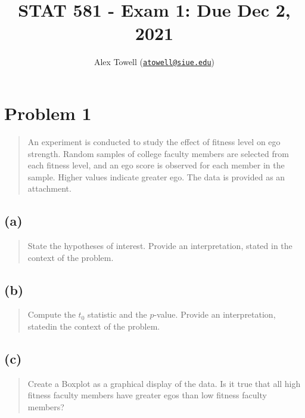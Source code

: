 \documentclass[
]{article}
\title{STAT 581 - Exam 1: Due Dec 2, 2021}
\author{Alex Towell
(\href{mailto:atowell@siue.edu}{\nolinkurl{atowell@siue.edu}})}
\date{}
\begin{document}
\maketitle

\hypertarget{problem-1}{%
\section{Problem 1}\label{problem-1}}

\begin{quote}
An experiment is conducted to study the effect of fitness level on ego
strength. Random samples of college faculty members are selected from
each fitness level, and an ego score is observed for each member in the
sample. Higher values indicate greater ego. The data is provided as an
attachment.
\end{quote}

\vspace{50pt}

\hypertarget{a}{%
\subsection{(a)}\label{a}}

\begin{quote}
State the hypotheses of interest. Provide an interpretation, stated in
the context of the problem.
\end{quote}

\vspace{50pt}

\hypertarget{b}{%
\subsection{(b)}\label{b}}

\begin{quote}
Compute the \(t_0\) statistic and the \(p\)-value. Provide an
interpretation, statedin the context of the problem.
\end{quote}

\vspace{50pt}

\hypertarget{c}{%
\subsection{(c)}\label{c}}

\begin{quote}
Create a Boxplot as a graphical display of the data. Is it true that all
high fitness faculty members have greater egos than low fitness faculty
members?
\end{quote}
\end{document}
